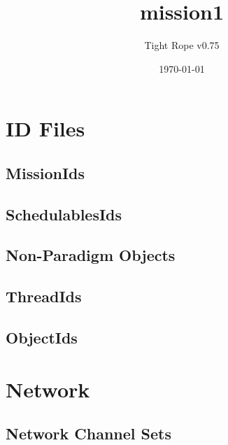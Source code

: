 \documentclass[10pt,a4paper]{article}
\title{mission1}
\author{Tight Rope v0.75}
\date{\today}
\begin{document}
\maketitle

\section{ID Files}
\subsection{MissionIds}

\newpage

\subsection{SchedulablesIds}

\newpage

\subsection{Non-Paradigm Objects}
\newpage

\subsection{ThreadIds}

\newpage

\subsection{ObjectIds}

\newpage

\section{Network}
\subsection{Network Channel Sets}




{}
\end{document}
